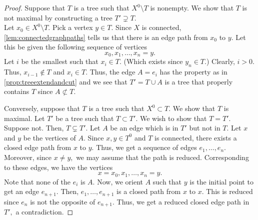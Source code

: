 \documentclass[12pt]{article}
\begin{document}
\begin{proof} 
	Suppose that $T$ is a tree such that $X^0 \setminus T$ is nonempty. We show that $T$ is not maximal by constructing a tree $T' \supsetneq T.$\\
	Let $x_0 \in X^0 \setminus T.$ Pick a vertex $y \in T.$ Since $X$ is connected, \cref{lem:connectedgraphpaths} tells us that there is an edge path from $x_0$ to $y.$ Let this be given the following sequence of vertices
	\begin{equation*} 
		x_0, x_1, \ldots, x_n = y.
	\end{equation*}
	Let $i$ be the smallest such that $x_i \in T.$ (Which exists since $y_n \in T.$) Clearly, $i > 0.$ Thus, $x_{i-1} \notin T$ and $x_i \in T.$ Thus, the edge $A = e_i$ has the property as in \cref{prop:treeextendandcut} and we see that $T' = T \cup A$ is a tree that properly contains $T$ since $A \not\subset T.$

	Conversely, suppose that $T$ is a tree such that $X^0 \subset T.$ We show that $T$ is maximal. Let $T'$ be a tree such that $T \subset T'.$ We wish to show that $T = T'.$\\
	Suppose not. Then, $T \subsetneq T'.$ Let $A$ be an edge which is in $T'$ but not in $T.$ Let $x$ and $y$ be the vertices of $A.$ Since $x, y \in T^0$ and $T$ is connected, there exists a closed edge path from $x$ to $y.$ Thus, we get a sequence of edges $e_1, \ldots, e_n.$ Moreover, since $x \neq y,$ we may assume that the path is reduced. Corresponding to these edges, we have the vertices
	\begin{equation*} 
		x = x_0, x_1, \ldots, x_n = y.
	\end{equation*}
	Note that none of the $e_i$ is $A.$ Now, we orient $A$ such that $y$ is the initial point to get an edge $e_{n+1}.$ Then, $e_1, \ldots, e_{n+1}$ is a closed path from $x$ to $x.$ This is reduced since $e_n$ is not the opposite of $e_{n+1}.$ Thus, we get a reduced closed edge path in $T',$ a contradiction.
\end{proof}
\end{document}
